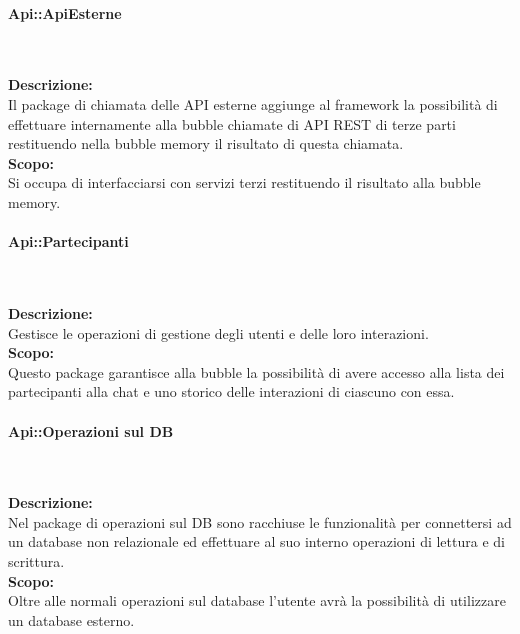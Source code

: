 \begin{samepage}
\paragraph{Api::ApiEsterne}\label{api-esterne}\mbox{}\\
\end{samepage}
\textbf{Descrizione:}\\ 
Il package di chiamata delle API esterne aggiunge al framework la possibilità di effettuare internamente alla bubble chiamate di API REST di terze parti restituendo nella bubble memory il risultato di questa chiamata. \\
\textbf{Scopo:}\\
Si occupa di interfacciarsi con servizi terzi restituendo il risultato alla bubble memory.\\

\begin{samepage}
\paragraph{Api::Partecipanti}\label{api-partecipanti}\mbox{}\\
\end{samepage}
\textbf{Descrizione:}\\ 
Gestisce le operazioni di gestione degli utenti e delle loro interazioni.\\
\textbf{Scopo:}\\
Questo package garantisce alla bubble la possibilità di avere accesso alla lista dei partecipanti alla chat e uno storico delle interazioni di ciascuno con essa.

\begin{samepage}
\paragraph{Api::Operazioni sul DB}\label{api-db}\mbox{}\\
\end{samepage}
\textbf{Descrizione:}\\
Nel package di operazioni sul DB sono racchiuse le funzionalità per connettersi ad un database non relazionale ed effettuare al suo interno operazioni di lettura e di scrittura.\\
\textbf{Scopo:}\\
Oltre alle normali operazioni sul database l'utente avrà la possibilità di utilizzare un database esterno.

